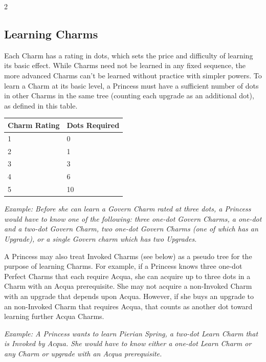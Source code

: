 \begin{multicols}{2}
\subsection*{Learning Charms}

Each Charm has a rating in dots, which sets the price and difficulty of learning its basic effect. While Charms need not be learned in any fixed sequence, the more advanced Charms can't be learned without practice with simpler powers. To learn a Charm at its basic level, a Princess must have a sufficient number of dots in other Charms in the same tree (counting each upgrade as an additional dot), as defined in this table. 

\begin{mybox}

    \begin{tabular}{|l|l|}
        \hline
        Charm Rating & Dots Required \\ \hline
        1            & 0             \\ \hline
        2            & 1             \\ \hline
        3            & 3             \\ \hline
        4            & 6             \\ \hline
        5            & 10            \\
        \hline
    \end{tabular}

\end{mybox}
    
\textit{Example: Before she can learn a Govern Charm rated at three dots, a Princess would have to know one of the following: three one-dot Govern Charms, a one-dot and a two-dot Govern Charm, two one-dot Govern Charms (one of which has an Upgrade), or a single Govern charm which has two Upgrades.}

A Princess may also treat Invoked Charms (see below) as a pseudo tree for the purpose of learning Charms. For example, if a Princess knows three one-dot Perfect Charms that each require Acqua, she can acquire up to three dots in a Charm with an Acqua prerequisite. She may not acquire a non-Invoked Charm with an upgrade that depends upon Acqua. However, if she buys an upgrade to an non-Invoked Charm that requires Acqua, that counts as another dot toward learning further Acqua Charms. 

\textit{Example: A Princess wants to learn Pierian Spring, a two-dot Learn Charm that is Invoked by Acqua. She would have to know either a one-dot Learn Charm or any Charm or upgrade with an Acqua prerequisite.}


\end{multicols}
